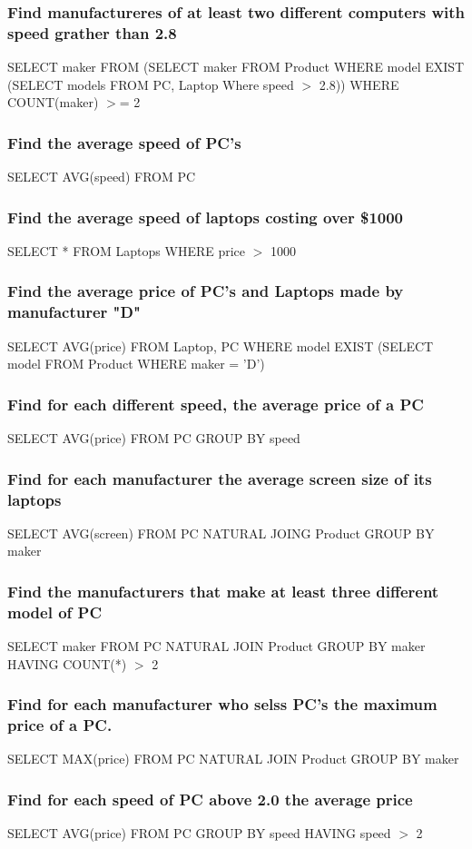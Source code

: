\documentclass[12pt, a4paper]{article}
\begin{document}
			\subsubsection{Find manufactureres of at least two different computers with speed grather than 2.8}
				SELECT maker FROM (SELECT maker FROM Product WHERE model EXIST (SELECT models FROM PC, Laptop Where speed $>$ 2.8)) WHERE COUNT(maker) $>$= 2		
			\subsubsection{Find the average speed of PC's}
				SELECT AVG(speed) FROM PC
			\subsubsection{Find the average speed of laptops costing over \$1000}
				SELECT * FROM Laptops WHERE price $>$ 1000
			\subsubsection{Find the average price of PC's and Laptops made by manufacturer "D"}
				SELECT AVG(price) FROM Laptop, PC WHERE model EXIST (SELECT model FROM Product WHERE maker = 'D')
			\subsubsection{Find for each different speed, the average price of a PC}
				SELECT AVG(price) FROM PC GROUP BY speed
			\subsubsection{Find for each manufacturer the average screen size of its laptops}
				SELECT AVG(screen) FROM PC NATURAL JOING Product GROUP BY maker
			\subsubsection{Find the manufacturers that make at least three different model of PC}
				SELECT maker FROM PC NATURAL JOIN Product GROUP BY maker HAVING COUNT(*) $>$ 2
			\subsubsection{Find for each manufacturer who selss PC's the maximum price of a PC.}
				SELECT MAX(price) FROM PC NATURAL JOIN Product GROUP BY maker
			\subsubsection{Find for each speed of PC above 2.0 the average price}
				SELECT AVG(price) FROM PC GROUP BY speed HAVING speed $>$ 2
			
				
				
					
				
			
\end{document}
